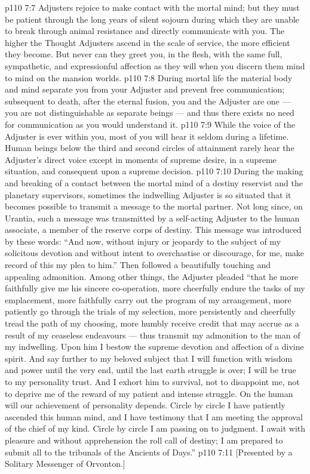 \vs p110 7:7 Adjusters rejoice to make contact with the mortal mind; but they must be patient through the long years of silent sojourn during which they are unable to break through animal resistance and directly communicate with you. The higher the Thought Adjusters ascend in the scale of service, the more efficient they become. But never can they greet you, in the flesh, with the same full, sympathetic, and expressionful affection as they will when you discern them mind to mind on the mansion worlds.
\vs p110 7:8 During mortal life the material body and mind separate you from your Adjuster and prevent free communication; subsequent to death, after the eternal fusion, you and the Adjuster are one --- you are not distinguishable as separate beings --- and thus there exists no need for communication as you would understand it.
\vs p110 7:9 While the voice of the Adjuster is ever within you, most of you will hear it seldom during a lifetime. Human beings below the third and second circles of attainment rarely hear the Adjuster’s direct voice except in moments of supreme desire, in a supreme situation, and consequent upon a supreme decision.
\vs p110 7:10 \pc During the making and breaking of a contact between the mortal mind of a destiny reservist and the planetary supervisors, sometimes the indwelling Adjuster is so situated that it becomes possible to transmit a message to the mortal partner. Not long since, on Urantia, such a message was transmitted by a self\hyp{}acting Adjuster to the human associate, a member of the reserve corps of destiny. This message was introduced by these words: “And now, without injury or jeopardy to the subject of my solicitous devotion and without intent to overchastise or discourage, for me, make record of this my plea to him.” Then followed a beautifully touching and appealing admonition. Among other things, the Adjuster pleaded “that he more faithfully give me his sincere co\hyp{}operation, more cheerfully endure the tasks of my emplacement, more faithfully carry out the program of my arrangement, more patiently go through the trials of my selection, more persistently and cheerfully tread the path of my choosing, more humbly receive credit that may accrue as a result of my ceaseless endeavours --- thus transmit my admonition to the man of my indwelling. Upon him I bestow the supreme devotion and affection of a divine spirit. And say further to my beloved subject that I will function with wisdom and power until the very end, until the last earth struggle is over; I will be true to my personality trust. And I exhort him to survival, not to disappoint me, not to deprive me of the reward of my patient and intense struggle. On the human will our achievement of personality depends. Circle by circle I have patiently ascended this human mind, and I have testimony that I am meeting the approval of the chief of my kind. Circle by circle I am passing on to judgment. I await with pleasure and without apprehension the roll call of destiny; I am prepared to submit all to the tribunals of the Ancients of Days.”
\vsetoff
\vs p110 7:11 [Presented by a Solitary Messenger of Orvonton.]
